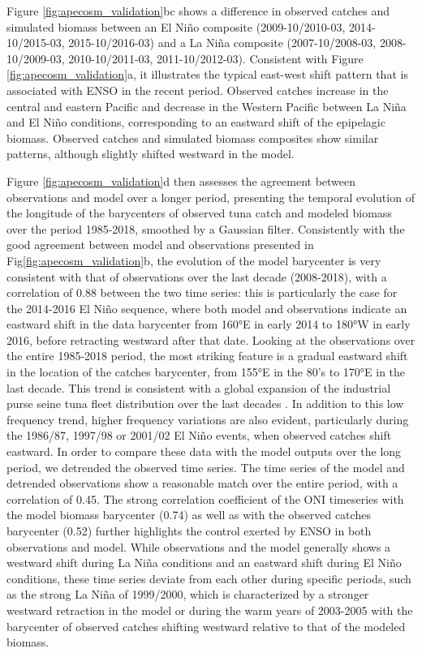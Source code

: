 Figure \ref{fig:apecosm_validation}bc shows a difference in observed catches and simulated biomass between an El Niño composite (2009-10/2010-03, 2014-10/2015-03, 2015-10/2016-03) and a La Niña composite (2007-10/2008-03, 2008-10/2009-03, 2010-10/2011-03, 2011-10/2012-03). Consistent with Figure \ref{fig:apecosm_validation}a, it illustrates the typical east-west shift pattern that is associated with ENSO in the recent period. Observed catches increase in the central and eastern Pacific and decrease in the Western Pacific between La Niña and El Niño conditions, corresponding to an eastward shift of the epipelagic biomass. Observed catches and simulated biomass composites show similar patterns, although slightly shifted westward in the model.

Figure \ref{fig:apecosm_validation}d then assesses the agreement between observations and model over a longer period,  presenting the temporal evolution of the longitude of the barycenters of observed tuna catch and modeled biomass over the period 1985-2018, smoothed by a Gaussian filter. Consistently with the good agreement between model and observations presented in Fig\ref{fig:apecosm_validation}b, the evolution of the model barycenter  is very consistent with that of observations over the last decade (2008-2018), with a correlation of 0.88 between the two time series: this is particularly the case for the 2014-2016 El Niño sequence, where both model and observations indicate an eastward shift in the data barycenter from 160°E in early 2014 to 180°W in early 2016, before retracting westward after that date. Looking at the observations over the entire 1985-2018 period, the most striking feature is a gradual eastward shift in the location of the catches barycenter, from 155°E in the 80's to 170°E in the last decade. This trend is
consistent with a global expansion of the industrial purse seine tuna fleet distribution over the last decades \citep{coulterUsingHarmonizedHistorical2020}. 
In addition to this low frequency trend, higher frequency variations are also evident, particularly during the 1986/87, 1997/98 or 2001/02 El Niño events, when observed catches shift eastward. In order to compare these data with the model outputs over the long period, we detrended the observed time series. The time series of the model and detrended observations show a reasonable match over the entire period, with a correlation of 0.45. The strong correlation coefficient of the ONI timeseries with the model biomass barycenter (0.74) as well as with the observed catches barycenter (0.52) further highlights the control exerted by ENSO in both observations and model. While observations and the model generally shows a westward shift during La Niña conditions and an eastward shift during El Niño conditions, these time series deviate from each other during specific periods, such as the strong La Niña of 1999/2000, which is characterized by a stronger westward retraction in the model or during the warm years of 2003-2005 with the barycenter of observed catches shifting westward relative to that of the modeled biomass.

